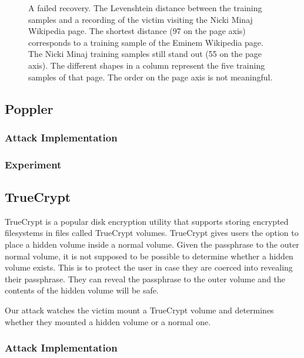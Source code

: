 \documentclass[letterpaper,twocolumn,10pt]{article}
\begin{document}
\begin{figure*}
    \centering
    
    \caption{A failed recovery. The Levenshtein distance between the training samples and
        a recording of the victim visiting the Nicki Minaj Wikipedia page. The
        shortest distance (97 on the page axis) corresponds to a training sample
        of the Eminem Wikipedia page. The Nicki Minaj training samples still
        stand out (55 on the page axis). The different shapes in a column
        represent the five training samples of that page. The order on the page
        axis is not meaningful.}
    \label{figure:minaj}
\end{figure*}

\subsection{Poppler}

\subsubsection{Attack Implementation}

\subsubsection{Experiment}

\subsection{TrueCrypt}

TrueCrypt is a popular disk encryption utility that supports storing encrypted
filesystems in files called TrueCrypt volumes. TrueCrypt gives users the option
to place a hidden volume inside a normal volume. Given the passphrase to the
outer normal volume, it is not supposed to be possible to determine whether
a hidden volume exists. This is to protect the user in case they are coerced
into revealing their passphrase. They can reveal the passphrase to the outer
volume and the contents of the hidden volume will be safe. 

Our attack watches the victim mount a TrueCrypt volume and determines whether
they mounted a hidden volume or a normal one.

\subsubsection{Attack Implementation}
\end{document}
